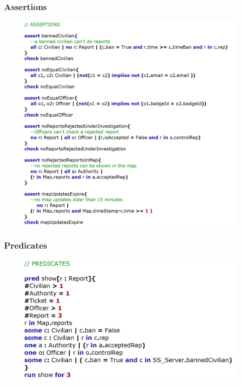 \documentclass[12pt,a4paper]{article}
\begin{document}
\subsubsection{Assertions}

\begin{figure}[H]
\begin{adjustwidth}{-25mm}{-25mm}
				\centering
				\includegraphics[width=.75\paperwidth,height=.75\paperheight, keepaspectratio]{Images/Alloy/asserts}
\end{adjustwidth}
\end{figure}

\subsubsection{Predicates}

\begin{figure}[H]
\begin{adjustwidth}{-25mm}{-25mm}
				\centering
				\includegraphics[width=.8\paperwidth,height=.8\paperheight, keepaspectratio]{Images/Alloy/preds}
\end{adjustwidth}
\end{figure}
\end{document}
